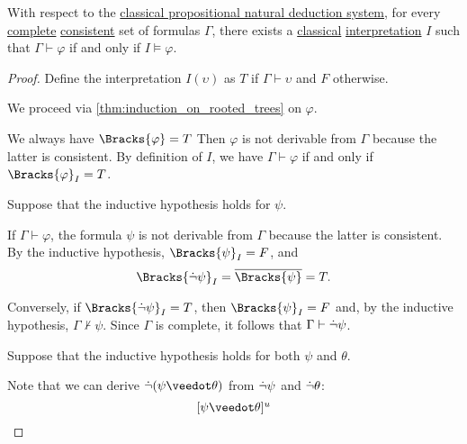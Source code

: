 \begin{proposition}\label{thm:consistent_implies_satisfiable_interpretation}
  With respect to the \hyperref[def:abstract_natural_deduction_system]{classical propositional natural deduction system}, for every \hyperref[def:complete_set_of_sentences]{complete} \hyperref[def:consistent_set_of_sentences]{consistent} set of formulas \( \Gamma \), there exists a \hyperref[def:propositional_semantics/classical]{classical} \hyperref[def:propositional_valuation/interpretation]{interpretation} \( I \) such that \( \Gamma \vdash \varphi \) if and only if \( I \vDash \varphi \).
\end{proposition}
\begin{proof}
  Define the interpretation \( I(\upsilon) \) as \( T \) if \( \Gamma \vdash \upsilon \) and \( F \) otherwise.

  We proceed via \cref{thm:induction_on_rooted_trees} on \( \varphi \).

   We always have \( \Bracks{\varphi} = T \)
   Then \( \varphi \) is not derivable from \( \Gamma \) because the latter is consistent.
   By definition of \( I \), we have \( \Gamma \vdash \varphi \) if and only if \( \Bracks{\varphi}_I = T \).

   Suppose that the inductive hypothesis holds for \( \psi \).

  \SufficiencySubProof* If \( \Gamma \vdash \varphi \), the formula \( \psi \) is not derivable from \( \Gamma \) because the latter is consistent. By the inductive hypothesis, \( \Bracks{\psi}_I = F \), and
  \begin{equation*}
    \Bracks{\synneg \psi}_I = \oline{\Bracks{\psi}} = T.
  \end{equation*}

  \NecessitySubProof* Conversely, if \( \Bracks{\synneg \psi}_I = T \), then \( \Bracks{\psi}_I = F \) and, by the inductive hypothesis, \( \Gamma \not\vdash \psi \). Since \( \Gamma \) is complete, it follows that \( \Gamma \vdash \dot{\neg} \psi \).

   Suppose that the inductive hypothesis holds for both \( \psi \) and \( \theta \).

  Note that we can derive \( \synneg (\psi \synvee \theta) \) from \( \dot{\neg} \psi \) and \( \dot{\neg} \theta \):
  \begin{equation*}
    \begin{prooftree}
      \hypo{ [\psi \synvee \theta]^u }


\end{prooftree}
\end{equation*}
\end{proof}
